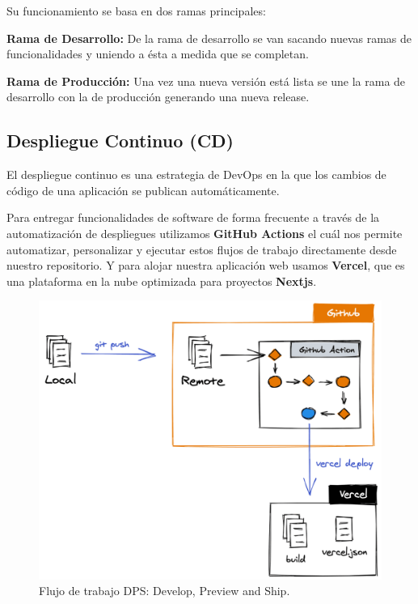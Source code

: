 \documentclass[12pt,twoside,titlepage]{report}
\begin{document}
Su funcionamiento se basa en dos ramas principales: 

\begin{compactitem}
    \item \textbf{Rama de Desarrollo:} De la rama de desarrollo se van sacando nuevas ramas de funcionalidades y uniendo a ésta a medida que se completan.
    \item \textbf{Rama de Producción:} Una vez una nueva versión está lista se une la rama de desarrollo con la de producción generando una nueva release.
\end{compactitem}

\subsection{Despliegue Continuo (CD)}

El despliegue continuo es una estrategia de DevOps en la que los cambios de código de una aplicación se publican automáticamente.

Para entregar funcionalidades de software de forma frecuente a través de la automatización de despliegues utilizamos \textbf{GitHub Actions} el cuál nos permite automatizar, personalizar y ejecutar estos flujos de trabajo directamente desde nuestro repositorio. Y para alojar nuestra aplicación web usamos \textbf{Vercel}, que es una plataforma en la nube optimizada para proyectos \textbf{Nextjs}.

\begin{figure}[H]
    \centering
    \includegraphics[scale=0.3]{DevOps/DPS}
    \caption{Flujo de trabajo DPS: Develop, Preview and Ship.}
    \label{fig:vercel_workflow}
\end{figure}
\end{document}
